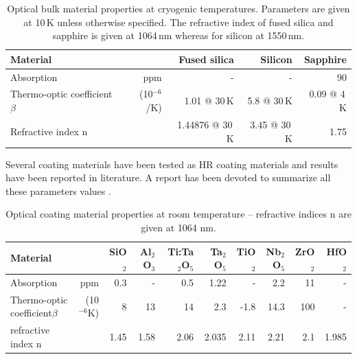 \begin{table}[h!]
\begin{center}
\begin{tabular}{|l r||r|r|r|}
  \hline
    {\large\strut} Material  & & Fused silica & Silicon & Sapphire \\
  \hline
  \hline
  {\large\strut} Absorption & ppm & - & - & 90 \cite{Tomaru2001} \\
  {\large\strut} \parbox{0.1\linewidth} {Thermo-optic \\ coefficient$\beta$}  & (10$^{-6}$/K) & 1.01 @ 30\,K & 5.8 @ 30\,K & 0.09 @ 4\,K \\
  {\large\strut} Refractive index n & & 1.44876 @ 30\,K & 3.45 @ 30\,K & 1.75\\
 \hline
\end{tabular}
\caption{Optical bulk material properties at cryogenic temperatures. Parameters are given at 10\,K unless otherwise specified. The refractive index of fused silica and sapphire is given at 1064\,nm whereas for silicon at 1550\,nm.}
\end{center}
\label{tab:Optics_Bulk_Param_cryo}
\end{table}

\FloatBarrier

Several coating materials have been tested as HR coating materials and results have been reported in literature. A report has been devoted to summarize all these parameters values \cite{Franc2009}.

\begin{table}[h!]
\begin{center}
\begin{tabular}{|l r||r|r|r|r|r|r|r|r|}
  \hline
    {\large\strut} Material  & & SiO$_2$ & Al$_2$O$_3$ & Ti:Ta$_2$O$_5$ & Ta$_2$O$_5$ & TiO$_2$ & Nb$_2$O$_5$ & ZrO$_2$ & HfO$_2$ \\
  \hline
  \hline
   {\large\strut} Absorption & ppm & 0.3 \cite{Flaminio2010} & - & 0.5 \cite{Flaminio2010} & 1.22 \cite{Flaminio2010} & - & 2.2 \cite{Flaminio2010} & 11 \cite{Flaminio2010} & - \\
   {\large\strut} \parbox{0.1\linewidth} {Thermo-optic \\ coefficient$\beta$}  & (10$^{-6}$K) &  8 & 13 & 14 & 2.3 & -1.8 & 14.3 & 100 & - \\
   {\large\strut} refractive index n & & 1.45 \cite{Flaminio2010} & 1.58 & 2.06 \cite{Flaminio2010} & 2.035 \cite{Flaminio2010} & 2.11 \cite{Song2008} & 2.21 \cite{Flaminio2010} & 2.1 \cite{Flaminio2010} & 1.985 \cite{Dai2009} \\
  \hline
\end{tabular}
\caption{Optical coating material properties at room temperature -- refractive indices n are given at 1064 nm.}
\end{center}
\label{tab:Optic_Coat_Param}
\end{table}

